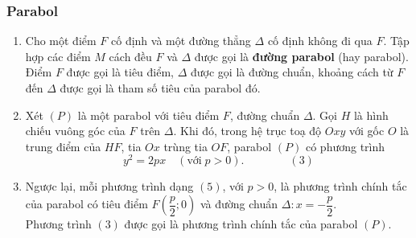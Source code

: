 \subsubsection{Parabol}
\begin{enumerate}[-]
	\item Cho một điểm $F$ cố định và một đường thẳng $\Delta$ cố định không đi qua $F$. Tập hợp các điểm $M$ cách đều $F$ và $\Delta$ được gọi là \textbf{đường parabol} (hay parabol). Điểm $F$ được gọi là tiêu điểm, $\Delta$ được gọi là đường chuẩn, khoảng cách từ $F$ đến $\Delta$ được gọi là tham số tiêu của parabol đó.
	\item Xét $(P)$ là một parabol với tiêu điểm $F$, đường chuẩn $\Delta$. Gọi $H$ là hình chiếu vuông góc của $F$ trên $\Delta$. Khi đó, trong hệ trục toạ độ $O x y$ với gốc $O$ là trung điểm của $H F$, tia $O x$ trùng tia $O F$, parabol $(P)$ có phương trình
	$$
	y^{2}=2 p x \quad (\text {với} \; p>0 ). \quad  \quad \quad \quad (3)
	$$
	\item Ngược lại, mỗi phương trình dạng $(5)$, với $p>0$, là phương trình chính tắc của parabol có tiêu điểm $F\left(\dfrac{p}{2} ; 0\right)$ và đường chuẩn $\Delta: x=-\dfrac{p}{2}$.\\Phương trình $ (3) $ được gọi là phương trình chính tắc của parabol $(P)$.
	\begin{center}
	\end{center}
\end{enumerate}
